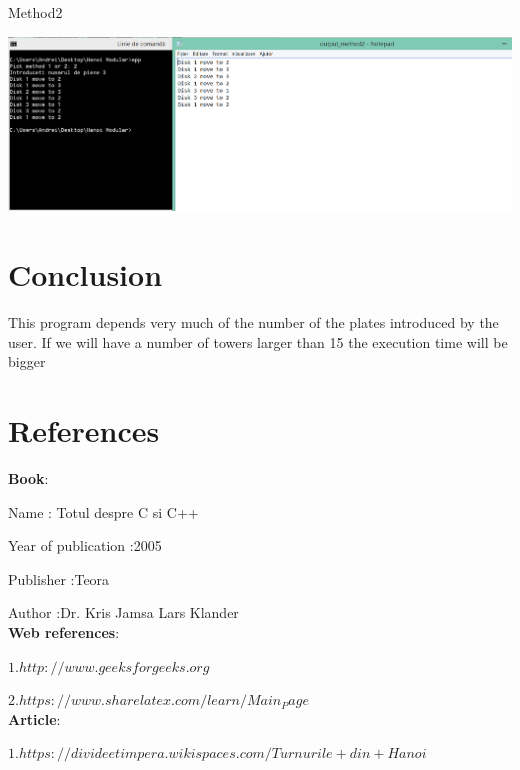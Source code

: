 \documentclass[12]{article}
\begin{document}
Method2

\includegraphics[scale=0.4]{metoda2.png}

\newpage
\section{Conclusion}

This program depends very much of the number of the plates introduced by the user. If we will have a number of towers larger than 15 the execution time will be bigger

\newpage
\section{References}

\textbf{Book}:

Name : Totul despre C si C++ 

Year of publication  :2005

Publisher :Teora

Author :Dr. Kris Jamsa Lars Klander\\
\textbf{Web references}:

$1.http://www.geeksforgeeks.org$

$2. https://www.sharelatex.com/learn/Main_Page$\\
\textbf{Article}:

$1.https://divideetimpera.wikispaces.com/Turnurile+din+Hanoi$
\end{document}
